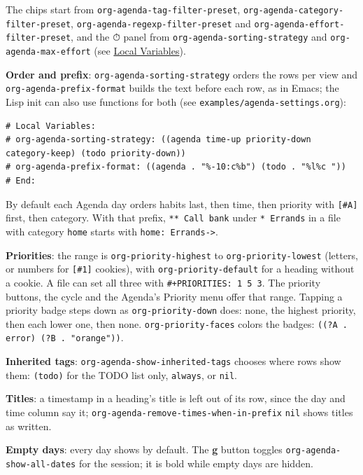 \documentclass[11pt]{article}
\begin{document}
The chips start from \texttt{org-agenda-tag-filter-preset}, \texttt{org-agenda-category-filter-preset}, \texttt{org-agenda-regexp-filter-preset} and \texttt{org-agenda-effort-filter-preset}, and the ⏱ panel from \texttt{org-agenda-sorting-strategy} and \texttt{org-agenda-max-effort} (see \hyperref[sec:org761a631]{Local Variables}).

\textbf{Order and prefix}: \texttt{org-agenda-sorting-strategy} orders the rows per view and \texttt{org-agenda-prefix-format} builds the text before each row, as in Emacs; the Lisp init can also use functions for both (see \texttt{examples/agenda-settings.org}):

\begin{verbatim}
# Local Variables:
# org-agenda-sorting-strategy: ((agenda time-up priority-down category-keep) (todo priority-down))
# org-agenda-prefix-format: ((agenda . "%-10:c%b") (todo . "%l%c "))
# End:
\end{verbatim}

By default each Agenda day orders habits last, then time, then priority with \texttt{[\#A]} first, then category. With that prefix, \texttt{** Call bank} under \texttt{* Errands} in a file with category \texttt{home} starts with \texttt{home:     Errands->}.

\textbf{Priorities}: the range is \texttt{org-priority-highest} to \texttt{org-priority-lowest} (letters, or numbers for \texttt{[\#1]} cookies), with \texttt{org-priority-default} for a heading without a cookie. A file can set all three with \texttt{\#+PRIORITIES: 1 5 3}. The priority buttons, the cycle and the Agenda's Priority menu offer that range. Tapping a priority badge steps down as \texttt{org-priority-down} does: none, the highest priority, then each lower one, then none. \texttt{org-priority-faces} colors the badges: \texttt{((?A . error) (?B . "orange"))}.

\textbf{Inherited tags}: \texttt{org-agenda-show-inherited-tags} chooses where rows show them: \texttt{(todo)} for the TODO list only, \texttt{always}, or \texttt{nil}.

\textbf{Titles}: a timestamp in a heading's title is left out of its row, since the day and time column say it; \texttt{org-agenda-remove-times-when-in-prefix} \texttt{nil} shows titles as written.

\textbf{Empty days}: every day shows by default. The \textbf{g} button toggles \texttt{org-agenda-show-all-dates} for the session; it is bold while empty days are hidden.
\end{document}
